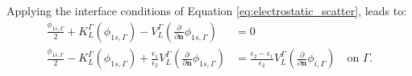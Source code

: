 \noindent Applying the interface conditions of Equation \eqref{eq:electrostatic_scatter},
leads to:
%
\begin{align} \label{eq:integral_eq_lspr}
\frac{\phi_{1s,\Gamma}}{2}+ K_{L}^{\Gamma}(\phi_{1s,\Gamma}) - V_{L}^{\Gamma} \left(\frac{\partial}{\partial \mathbf{n}}\phi_{1s,\Gamma} \right) &= 0  \nonumber \\
\frac{\phi_{1s,\Gamma}}{2} - K_{L}^{\Gamma}(\phi_{1s,\Gamma}) + \frac{\epsilon_1}{\epsilon_2}V_{L}^{\Gamma} \left( \frac{\partial}{\partial \mathbf{n}} \phi_{1s,\Gamma}  \right) &= \frac{\epsilon_2-\epsilon_1}{\epsilon_2}V_{L}^{\Gamma}\left( \frac{\partial}{\partial \mathbf{n}} \phi_{i,\Gamma} \right)\quad \text{on $\Gamma$.}
\end{align}









